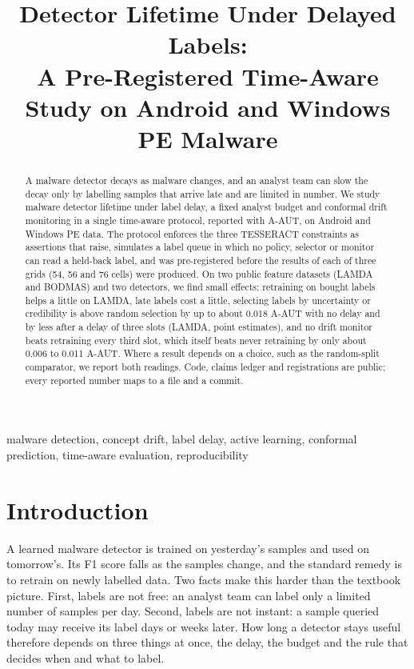 \documentclass[conference,a4paper]{IEEEtran}
\begin{document}
\title{Detector Lifetime Under Delayed Labels:\\
A Pre-Registered Time-Aware Study on Android and Windows PE Malware}

\author{}

\maketitle

\begin{abstract}
A malware detector decays as malware changes, and an analyst team can slow the decay only by labelling samples that arrive late and are limited in number. We study malware detector lifetime under label delay, a fixed analyst budget and conformal drift monitoring in a single time-aware protocol, reported with A-AUT, on Android and Windows PE data. The protocol enforces the three TESSERACT constraints as assertions that raise, simulates a label queue in which no policy, selector or monitor can read a held-back label, and was pre-registered before the results of each of three grids (54, 56 and 76 cells) were produced. On two public feature datasets (LAMDA and BODMAS) and two detectors, we find small effects: retraining on bought labels helps a little on LAMDA, late labels cost a little, selecting labels by uncertainty or credibility is above random selection by up to about 0.018 A-AUT with no delay and by less after a delay of three slots (LAMDA, point estimates), and no drift monitor beats retraining every third slot, which itself beats never retraining by only about 0.006 to 0.011 A-AUT. Where a result depends on a choice, such as the random-split comparator, we report both readings. Code, claims ledger and registrations are public; every reported number maps to a file and a commit.
\end{abstract}

\begin{IEEEkeywords}
malware detection, concept drift, label delay, active learning, conformal prediction, time-aware evaluation, reproducibility
\end{IEEEkeywords}

\section{Introduction}
A learned malware detector is trained on yesterday's samples and used on tomorrow's. Its F1 score falls as the samples change, and the standard remedy is to retrain on newly labelled data. Two facts make this harder than the textbook picture. First, labels are not free: an analyst team can label only a limited number of samples per day. Second, labels are not instant: a sample queried today may receive its label days or weeks later. How long a detector stays useful therefore depends on three things at once, the delay, the budget and the rule that decides when and what to label.
\end{document}
